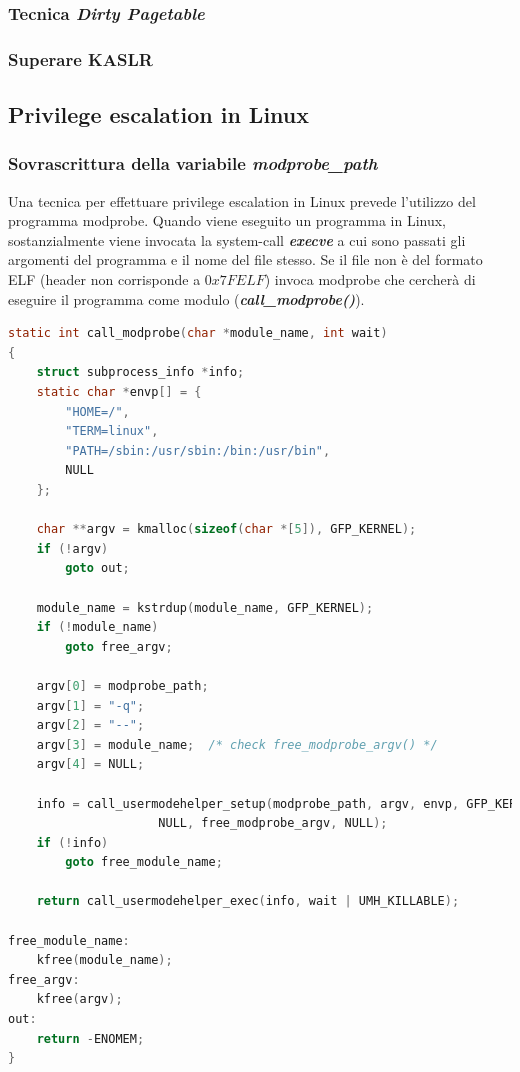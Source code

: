 \documentclass{article}
\begin{document}
\clearpage


\subsubsection{Tecnica \textit{Dirty Pagetable}}

\subsubsection{Superare KASLR}


\subsection{Privilege escalation in Linux}
\subsubsection{Sovrascrittura della variabile \textit{modprobe\_path}}
Una tecnica per effettuare privilege escalation in Linux prevede l'utilizzo del programma 
modprobe. Quando viene eseguito un programma in Linux, sostanzialmente viene invocata 
la system-call \textbf{\textit{execve}} a cui sono passati gli argomenti del programma 
e il nome del file stesso. Se il file non è del formato ELF (header non corrisponde a $0x7FELF$) 
invoca modprobe che cercherà di eseguire il programma come modulo (\textbf{\textit{call\_modprobe()}}). 

\begin{lstlisting}[language=C,caption="Invocazione del programma modprobe per la gestione dei programmi dal formato sconosciuto"]
static int call_modprobe(char *module_name, int wait)
{
	struct subprocess_info *info;
	static char *envp[] = {
		"HOME=/",
		"TERM=linux",
		"PATH=/sbin:/usr/sbin:/bin:/usr/bin",
		NULL
	};

	char **argv = kmalloc(sizeof(char *[5]), GFP_KERNEL);
	if (!argv)
		goto out;

	module_name = kstrdup(module_name, GFP_KERNEL);
	if (!module_name)
		goto free_argv;

	argv[0] = modprobe_path;
	argv[1] = "-q";
	argv[2] = "--";
	argv[3] = module_name;	/* check free_modprobe_argv() */
	argv[4] = NULL;

	info = call_usermodehelper_setup(modprobe_path, argv, envp, GFP_KERNEL,
					 NULL, free_modprobe_argv, NULL);
	if (!info)
		goto free_module_name;

	return call_usermodehelper_exec(info, wait | UMH_KILLABLE);

free_module_name:
	kfree(module_name);
free_argv:
	kfree(argv);
out:
	return -ENOMEM;
} 
\end{lstlisting}
\end{document}
